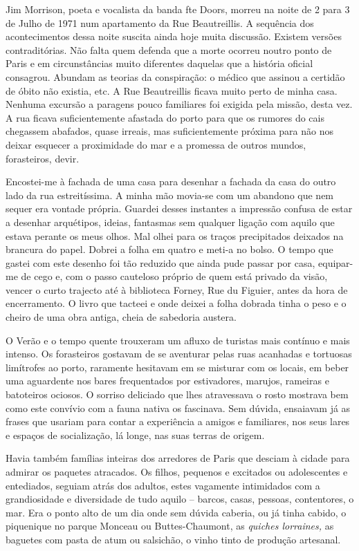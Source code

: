 Jim Morrison, poeta e vocalista da banda fte Doors, morreu na noite de
2 para 3 de Julho de 1971 num apartamento da Rue Beautreillis. A
sequência dos acontecimentos dessa noite suscita ainda hoje muita
discussão. Existem versões contraditórias. Não falta quem defenda que
a morte ocorreu noutro ponto de Paris e em circunstâncias muito
diferentes daquelas que a história oficial consagrou. Abundam as teorias
da conspiração: o médico que assinou a certidão de óbito não existia, etc. A Rue Beautreillis ficava muito perto de minha casa. Nenhuma
excursão a paragens pouco familiares foi exigida pela missão, desta vez.
A rua ficava suficientemente afastada do porto para que os rumores do
cais chegassem abafados, quase irreais, mas suficientemente próxima para
não nos deixar esquecer a proximidade do mar e a promessa de outros
mundos, forasteiros, devir.

Encostei-me à fachada de uma casa para desenhar a fachada da casa do
outro lado da rua estreitíssima. A minha mão movia-se com um abandono
que nem sequer era vontade própria. Guardei desses instantes a impressão
confusa de estar a desenhar arquétipos, ideias, fantasmas sem qualquer
ligação com aquilo que estava perante os meus olhos. Mal olhei para os
traços precipitados deixados na brancura do papel. Dobrei a folha em
quatro e meti-a no bolso. O tempo que gastei com este desenho foi tão
reduzido que ainda pude passar por casa, equipar-me de cego e, com o
passo cauteloso próprio de quem está privado da visão, vencer o curto
trajecto até à biblioteca Forney, Rue du Figuier, antes da hora de
encerramento. O livro que tacteei e onde deixei a folha dobrada tinha o
peso e o cheiro de uma obra antiga, cheia de sabedoria austera.



O Verão e o tempo quente trouxeram um afluxo de turistas mais contínuo
e mais intenso. Os forasteiros gostavam de se aventurar pelas ruas
acanhadas e tortuosas limítrofes ao porto, raramente hesitavam em se
misturar com os locais, em beber uma aguardente nos bares frequentados
por estivadores, marujos, rameiras e batoteiros ociosos. O sorriso
deliciado que lhes atravessava o rosto mostrava bem como este convívio
com a fauna nativa os fascinava. Sem dúvida, ensaiavam já as frases que
usariam para contar a experiência a amigos e familiares, nos seus lares
e espaços de socialização, lá longe, nas suas terras de origem.

Havia também famílias inteiras dos arredores de Paris que desciam à
cidade para admirar os paquetes atracados. Os filhos, pequenos e
excitados ou adolescentes e entediados, seguiam atrás dos adultos, estes
vagamente intimidados com a grandiosidade e diversidade de tudo aquilo
-- barcos, casas, pessoas, contentores, o mar. Era o ponto alto de um
dia onde sem dúvida caberia, ou já tinha cabido, o piquenique no parque
Monceau ou Buttes-Chaumont, as \emph{quiches lorraines, }as baguetes com
pasta de atum ou salsichão, o vinho tinto de produção artesanal.

